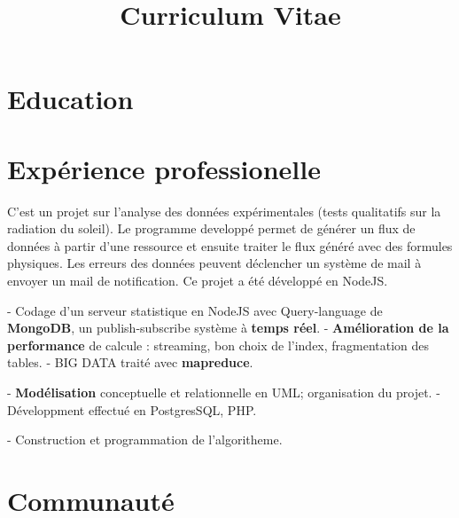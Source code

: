\documentclass[11pt,a4paper]{moderncv}
\title{Curriculum Vitae}
\begin{document}
\maketitle

\section{Education}


\section{Expérience professionelle}
{
C'est un projet sur l'analyse des données expérimentales (tests qualitatifs sur la radiation du soleil). Le programme developpé permet de générer un flux de données à partir d'une ressource et ensuite traiter le flux généré avec des formules physiques. Les erreurs des données peuvent déclencher un système de mail à envoyer un mail de notification. Ce projet a été développé en NodeJS.
}

{
- Codage d'un serveur statistique en NodeJS avec Query-language de \textbf{MongoDB}, un publish-subscribe système à \textbf{temps réel}.\newline
- \textbf{Amélioration de la performance} de calcule : streaming, bon choix de l'index, fragmentation des tables.\newline
- BIG DATA traité avec \textbf{mapreduce}.
}

{
- \textbf{Modélisation} conceptuelle et relationnelle en UML; organisation du projet.\newline
- Développment effectué en PostgresSQL, PHP.
}

{
- Construction et programmation de l'algoritheme.
}

\section{Communauté}
\end{document}
